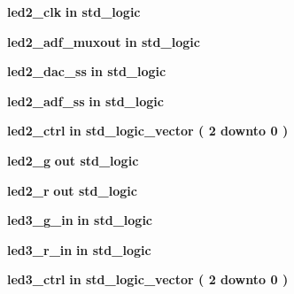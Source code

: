 \begin{DoxyCompactItemize}
{\bf led2\+\_\+clk}  {\bfseries {\bfseries \textcolor{keywordflow}{in}\textcolor{vhdlchar}{ }}} {\bfseries \textcolor{comment}{std\+\_\+logic}\textcolor{vhdlchar}{ }} 
\item 
{\bf led2\+\_\+adf\+\_\+muxout}  {\bfseries {\bfseries \textcolor{keywordflow}{in}\textcolor{vhdlchar}{ }}} {\bfseries \textcolor{comment}{std\+\_\+logic}\textcolor{vhdlchar}{ }} 
\item 
{\bf led2\+\_\+dac\+\_\+ss}  {\bfseries {\bfseries \textcolor{keywordflow}{in}\textcolor{vhdlchar}{ }}} {\bfseries \textcolor{comment}{std\+\_\+logic}\textcolor{vhdlchar}{ }} 
\item 
{\bf led2\+\_\+adf\+\_\+ss}  {\bfseries {\bfseries \textcolor{keywordflow}{in}\textcolor{vhdlchar}{ }}} {\bfseries \textcolor{comment}{std\+\_\+logic}\textcolor{vhdlchar}{ }} 
\item 
{\bf led2\+\_\+ctrl}  {\bfseries {\bfseries \textcolor{keywordflow}{in}\textcolor{vhdlchar}{ }}} {\bfseries \textcolor{comment}{std\+\_\+logic\+\_\+vector}\textcolor{vhdlchar}{ }\textcolor{vhdlchar}{(}\textcolor{vhdlchar}{ }\textcolor{vhdlchar}{ } \textcolor{vhdldigit}{2} \textcolor{vhdlchar}{ }\textcolor{keywordflow}{downto}\textcolor{vhdlchar}{ }\textcolor{vhdlchar}{ } \textcolor{vhdldigit}{0} \textcolor{vhdlchar}{ }\textcolor{vhdlchar}{)}\textcolor{vhdlchar}{ }} 
\item 
{\bf led2\+\_\+g}  {\bfseries {\bfseries \textcolor{keywordflow}{out}\textcolor{vhdlchar}{ }}} {\bfseries \textcolor{comment}{std\+\_\+logic}\textcolor{vhdlchar}{ }} 
\item 
{\bf led2\+\_\+r}  {\bfseries {\bfseries \textcolor{keywordflow}{out}\textcolor{vhdlchar}{ }}} {\bfseries \textcolor{comment}{std\+\_\+logic}\textcolor{vhdlchar}{ }} 
\item 
{\bf led3\+\_\+g\+\_\+in}  {\bfseries {\bfseries \textcolor{keywordflow}{in}\textcolor{vhdlchar}{ }}} {\bfseries \textcolor{comment}{std\+\_\+logic}\textcolor{vhdlchar}{ }} 
\item 
{\bf led3\+\_\+r\+\_\+in}  {\bfseries {\bfseries \textcolor{keywordflow}{in}\textcolor{vhdlchar}{ }}} {\bfseries \textcolor{comment}{std\+\_\+logic}\textcolor{vhdlchar}{ }} 
\item 
{\bf led3\+\_\+ctrl}  {\bfseries {\bfseries \textcolor{keywordflow}{in}\textcolor{vhdlchar}{ }}} {\bfseries \textcolor{comment}{std\+\_\+logic\+\_\+vector}\textcolor{vhdlchar}{ }\textcolor{vhdlchar}{(}\textcolor{vhdlchar}{ }\textcolor{vhdlchar}{ } \textcolor{vhdldigit}{2} \textcolor{vhdlchar}{ }\textcolor{keywordflow}{downto}\textcolor{vhdlchar}{ }\textcolor{vhdlchar}{ } \textcolor{vhdldigit}{0} \textcolor{vhdlchar}{ }\textcolor{vhdlchar}{)}\textcolor{vhdlchar}{ }} 

\end{DoxyCompactItemize}

